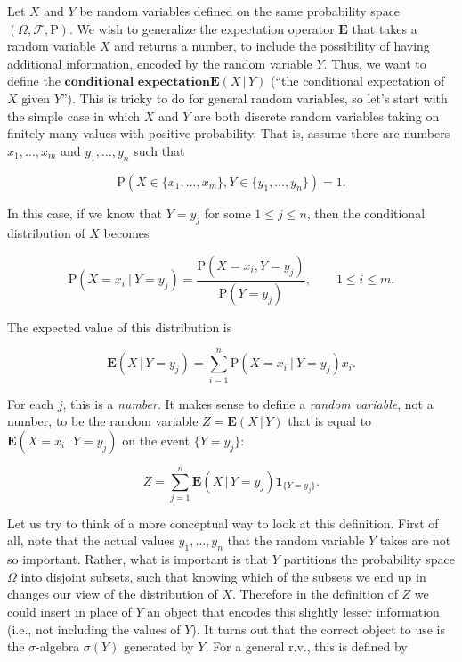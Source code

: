 \documentclass[11pt]{report}
\theoremstyle{plain}
\theoremstyle{definition}
\begin{document}
Let $X$ and $Y$ be random variables defined on the
same probability space
$(\Omega, \mathcal{F}, \mathrm{P})$. We wish to
generalize the expectation operator $\mathbf{E}$ that
takes a random variable $X$ and returns a number, to
include the possibility of having additional
information, encoded by the random variable $Y$.
Thus, we want to define the
$\textbf{conditional expectation}$$\mathbf{E}\left(X\,|\,Y\right)$ (``the conditional
expectation of $X$ given $Y$''). This is tricky to do
for general random variables, so let's start with the
simple case in which $X$ and $Y$ are both discrete
random variables taking on finitely many values with
positive probability. That is, assume there are
numbers $x_1,\ldots, x_m$ and $y_1,\ldots, y_n$ such
that

\[
\mathrm{P}\left( X \in \{ x_1,\ldots, x_m\}, Y \in \{ y_1,\ldots, y_n \} \right) = 1.
\]

\noindent In this case, if we know that $Y=y_j$ for some
$1\le j\le n$, then the conditional distribution of
$X$ becomes

\[
\mathrm{P}(X = x_i\ |\ Y=y_j) = \frac{\mathrm{P}(X=x_i, Y=y_j)}{\mathrm{P}(Y=y_j)}, \qquad 1\le i\le m.
\]

\noindent The expected value of this distribution is

\[
\mathbf{E}\left(X\,|\,Y=y_j\right) = \sum_{i=1}^n \mathrm{P}(X = x_i\ |\ Y=y_j) x_i.
\]

\noindent For each $j$, this is a \emph{number}. It makes sense to
define a \emph{random variable}, not a number, to be the
random variable $Z=\mathbf{E}\left(X\,|\,Y\right)$
that is equal to
$\mathbf{E}\left(X=x_i\,|\,Y=y_j\right)$ on the event
$\{Y=y_j\}$:

\[
Z = \sum_{j=1}^n \mathbf{E}\left(X\,|\,Y=y_j\right) \mathbf{1}_{\{Y=y_j\}}.
\]

\noindent Let us try to think of a more conceptual way to look
at this definition. First of all, note that the actual
values $y_1,\ldots, y_n$ that the random variable $Y$
takes are not so important. Rather, what is important
is that $Y$ partitions the probability space $\Omega$
into disjoint subsets, such that knowing which of the
subsets we end up in changes our view of the
distribution of $X$. Therefore in the definition of
$Z$ we could insert in place of $Y$ an object that
encodes this slightly lesser information (i.e., not
including the values of $Y$). It turns out that the
correct object to use is the $\sigma$-algebra
$\sigma(Y)$ generated by $Y$. For a general r.v.,
this is defined by
\end{document}
